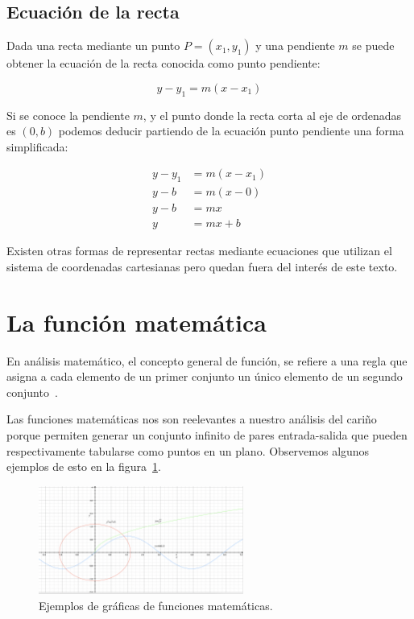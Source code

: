 \documentclass[12pt, oneside]{article}
\begin{document}
\subsection{Ecuación de la recta}
Dada una recta mediante un punto $P=(x_1, y_1)$ y una pendiente $m$ se puede obtener la ecuación de la recta conocida como punto pendiente:

\begin{equation}
\label{eq:puntoPendiente}
y-y_1 = m(x-x_1)
\end{equation}

Si se conoce la pendiente $m$, y el punto donde la recta corta al eje de ordenadas es $(0,b)$ podemos deducir partiendo de la ecuación punto pendiente una forma simplificada:

\begin{equation}
\begin{aligned}
y - y_1 &= m(x - x_1) \\
y - b   &= m(x - 0) \\
y - b   &= mx \\
y       &= mx + b
\end{aligned}
\end{equation}

Existen otras formas de representar rectas mediante ecuaciones que utilizan el sistema de coordenadas cartesianas pero quedan fuera del interés de este texto.

\section{La función matemática}
En análisis matemático, el concepto general de función, se refiere a una regla que asigna a cada elemento de un primer conjunto un único elemento de un segundo conjunto~\cite{eswiki:funcionMat}.

Las funciones matemáticas nos son reelevantes a nuestro análisis del cariño porque permiten generar un conjunto infinito de pares entrada-salida que pueden respectivamente tabularse como puntos en un plano.
Observemos algunos ejemplos de esto en la figura~\ref{fig:grafFunciones}.

\begin{figure}[h]
\centering
\includegraphics[width=0.6\textwidth]{grafFunciones.png}
\caption{Ejemplos de gráficas de funciones matemáticas.}
\label{fig:grafFunciones}
\end{figure}
\end{document}
